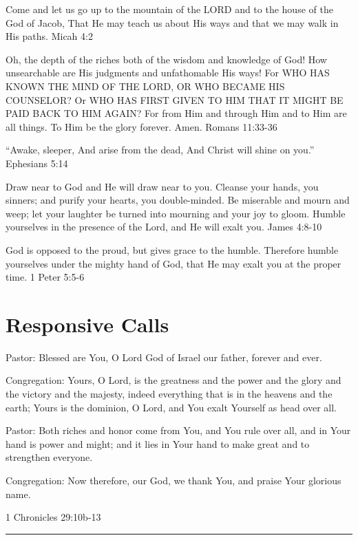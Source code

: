 \documentclass[]{book}
\begin{document}
Come and let us go up to the mountain of the LORD and to the house of
the God of Jacob, That He may teach us about His ways and that we may
walk in His paths. \textbar{} Micah 4:2

Oh, the depth of the riches both of the wisdom and knowledge of God! How
unsearchable are His judgments and unfathomable His ways! For WHO HAS
KNOWN THE MIND OF THE LORD, OR WHO BECAME HIS COUNSELOR? Or WHO HAS
FIRST GIVEN TO HIM THAT IT MIGHT BE PAID BACK TO HIM AGAIN? For from Him
and through Him and to Him are all things. To Him be the glory forever.
Amen. \textbar{} Romans 11:33-36

``Awake, sleeper, And arise from the dead, And Christ will shine on
you.'' \textbar{} Ephesians 5:14

Draw near to God and He will draw near to you. Cleanse your hands, you
sinners; and purify your hearts, you double-minded. Be miserable and
mourn and weep; let your laughter be turned into mourning and your joy
to gloom. Humble yourselves in the presence of the Lord, and He will
exalt you. \textbar{} James 4:8-10

God is opposed to the proud, but gives grace to the humble. Therefore
humble yourselves under the mighty hand of God, that He may exalt you at
the proper time. \textbar{} 1 Peter 5:5-6

\section*{Responsive Calls}\label{responsive-calls}

Pastor: Blessed are You, O Lord God of Israel our father, forever and
ever.

Congregation: Yours, O Lord, is the greatness and the power and the
glory and the victory and the majesty, indeed everything that is in the
heavens and the earth; Yours is the dominion, O Lord, and You exalt
Yourself as head over all.

Pastor: Both riches and honor come from You, and You rule over all, and
in Your hand is power and might; and it lies in Your hand to make great
and to strengthen everyone.

Congregation: Now therefore, our God, we thank You, and praise Your
glorious name.

1 Chronicles 29:10b-13 \textbar{}

\begin{center}\rule{0.5\linewidth}{\linethickness}\end{center}
\end{document}
